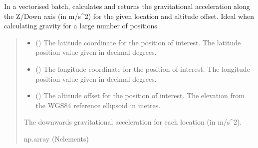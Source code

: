 \documentclass[letterpaper,10pt,english]{sphinxmanual}
\begin{document}
\begin{fulllineitems}
\begin{fulllineitems}
\label{\detokenize{modules/gravity/irish:qnav.gravity.irish.IrishSeaGravity.calc_gravity_z_vec}}
\pysigstartsignatures
{}
\pysigstopsignatures
\sphinxAtStartPar
In a vectorised batch, calculates and returns the gravitational
acceleration along the Z/Down axis (in m/s\textasciicircum{}2) for the given location
and altitude offset. Ideal when calculating gravity for a large
number of positions.
\begin{quote}\begin{description}
\begin{itemize}
\item {} 
\sphinxAtStartPar
{} () \textendash{} The latitude coordinate for the position of interest.
The latitude position value given in decimal degrees.

\item {} 
\sphinxAtStartPar
{} () \textendash{} The longitude coordinate for the position of interest.
The longitude position value given in decimal degrees.

\item {} 
\sphinxAtStartPar
{} () \textendash{} The altitude offset for the position of interest.
The elevation from the WGS\sphinxhyphen{}84 reference ellipsoid in metres.

\end{itemize}

\sphinxAtStartPar
The downwards gravitational acceleration for each location
(in m/s\textasciicircum{}2).

\sphinxAtStartPar
np.array (N\sphinxhyphen{}elements)

\end{description}\end{quote}

\end{fulllineitems}


\end{fulllineitems}
\end{document}
